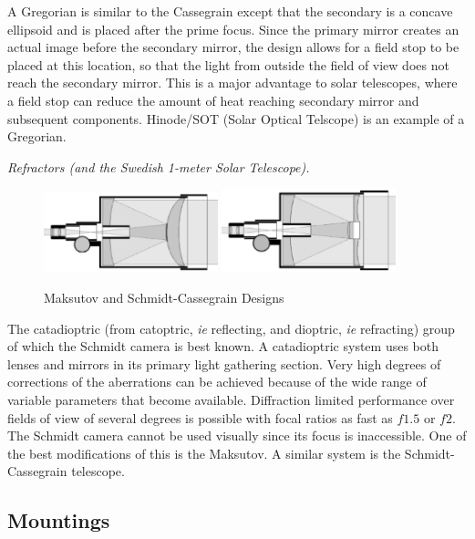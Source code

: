 A Gregorian is similar to the Cassegrain except that the secondary is a
concave ellipsoid and is placed after the prime focus. Since the primary 
mirror creates an actual image before the secondary mirror, the design
allows for a field stop to be placed at this location, so that the light from outside
the field of view does not reach the secondary mirror. This is a major advantage
to solar telescopes, where a field stop can reduce the amount of heat reaching secondary
mirror and subsequent components. Hinode/SOT (Solar Optical Telscope) is an 
example of a Gregorian.

{\it Refractors (and the Swedish 1-meter Solar Telescope).}

\begin{figure}[th!]
	\centering
	\includegraphics[width=0.45\textwidth]{maksutovcassegraindetailed.eps}
	\includegraphics[width=0.45\textwidth]{schmidtcassegraindetailed.eps}
  \caption{Maksutov and Schmidt-Cassegrain Designs}
  \label{fig:catadiotropic}
\end{figure}

The catadioptric (from catoptric, {\it ie} reflecting, and dioptric, {\it ie} 
refracting) group of which the Schmidt camera is best known. A catadioptric 
system uses both lenses and mirrors in its primary light gathering section.
Very high degrees of corrections of the aberrations can be achieved because
of the wide range of variable parameters that become available. Diffraction
limited performance over fields of view of several degrees is possible with
focal ratios as fast as $f1.5$ or $f2$. The Schmidt
camera cannot be used visually since its focus is inaccessible. One of the best
modifications of this is the Maksutov. A similar system is the 
Schmidt-Cassegrain telescope. 

\subsection{Mountings}


